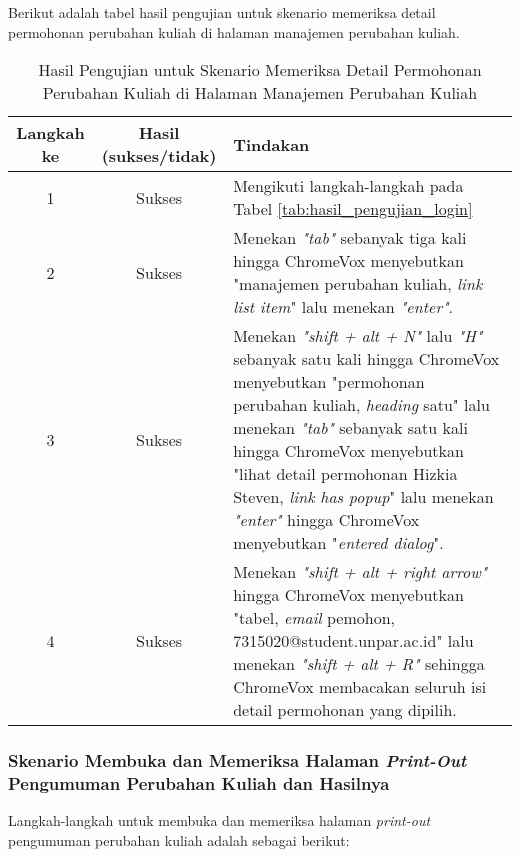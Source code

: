 Berikut adalah tabel hasil pengujian untuk skenario memeriksa detail permohonan perubahan kuliah di halaman manajemen perubahan kuliah.

\begin{table}[H]
    \centering 
    \caption{Hasil Pengujian untuk Skenario Memeriksa Detail Permohonan Perubahan Kuliah di Halaman Manajemen Perubahan Kuliah}
    \label{tab:hasil_pengujian_memeriksa_detail_permohonan_perubahan_kuliah_di_halaman_manajemen_perubahan_kuliah}
    \begin{tabular}{|c|c|p{10cm}|}
        \toprule
        Langkah ke & Hasil (sukses/tidak) & Tindakan \\

        \midrule
        1 & Sukses & Mengikuti langkah-langkah pada Tabel \ref{tab:hasil_pengujian_login} \\
        2 & Sukses & Menekan \textit{"tab"} sebanyak tiga kali hingga ChromeVox menyebutkan "manajemen perubahan kuliah, \textit{link list item}" lalu menekan \textit{"enter"}. \\
        3 & Sukses & Menekan \textit{"shift + alt + N"} lalu \textit{"H"} sebanyak satu kali hingga ChromeVox menyebutkan "permohonan perubahan kuliah, \textit{heading} satu" lalu menekan \textit{"tab"} sebanyak satu kali hingga ChromeVox menyebutkan "lihat detail permohonan Hizkia Steven, \textit{link has popup}" lalu menekan \textit{"enter"} hingga ChromeVox menyebutkan "\textit{entered dialog}". \\
        4 & Sukses & Menekan \textit{"shift + alt + right arrow"} hingga ChromeVox menyebutkan "tabel, \textit{email} pemohon, 7315020@student.unpar.ac.id" lalu menekan \textit{"shift + alt + R"} sehingga ChromeVox membacakan seluruh isi detail permohonan yang dipilih. \\

        \bottomrule

    \end{tabular}
\end{table}

\subsubsection{Skenario Membuka dan Memeriksa Halaman \textit{Print-Out} Pengumuman Perubahan Kuliah dan Hasilnya}
\label{subsubsec:skenario_membuka_dan_memeriksa_halaman_print_out_pengumuman_perubahan_kuliah}
Langkah-langkah untuk membuka dan memeriksa halaman \textit{print-out} pengumuman perubahan kuliah adalah sebagai berikut:


